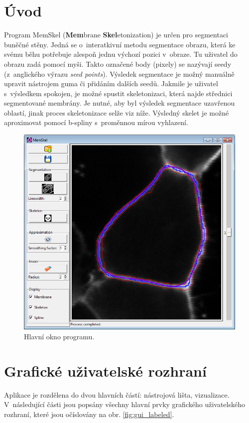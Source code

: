 \section{Úvod}
Program MemSkel (\textbf{Mem}brane \textbf{Skel}etonization) je určen pro segmentaci buněčné stěny. Jedná se o~interatkivní metodu segmentace obrazu, která ke svému běhu potřebuje alespoň jednu výchozí pozici v~obraze. Tu uživatel do obrazu zadá pomocí myši. Takto označené body (pixely) se nazývají seedy (z~anglického výrazu \textit{seed points}). Výsledek segmentace je možný manuálně upravit nástrojem guma či přidáním dalších seedů. Jakmile je uživatel s~výsledkem spokojen, je možné spustit skeletonizaci, která najde střednici segmentované membrány. Je nutné, aby byl výsledek segmentace uzavřenou oblastí, jinak proces skeletonizace selže viz níže. Výsledný skelet je možné aproximovat pomocí b-spliny s~proměnnou mírou vyhlazení.

\begin{figure}[htb]
    \centering
    \includegraphics[width = .7\linewidth]{gui.png}
    \caption{Hlavní okno programu.}
    \label{fig:gui}
\end{figure}

\section{Grafické uživatelské rozhraní} \label{sec:stEd}
Aplikace je rozdělena do dvou hlavních částí: nástrojová lišta, vizualizace. V~následující části jsou popsány všechny hlavní prvky grafického uživatelského rozhraní, které jsou očíslovány na obr. \ref{fig:gui_labeled}.

